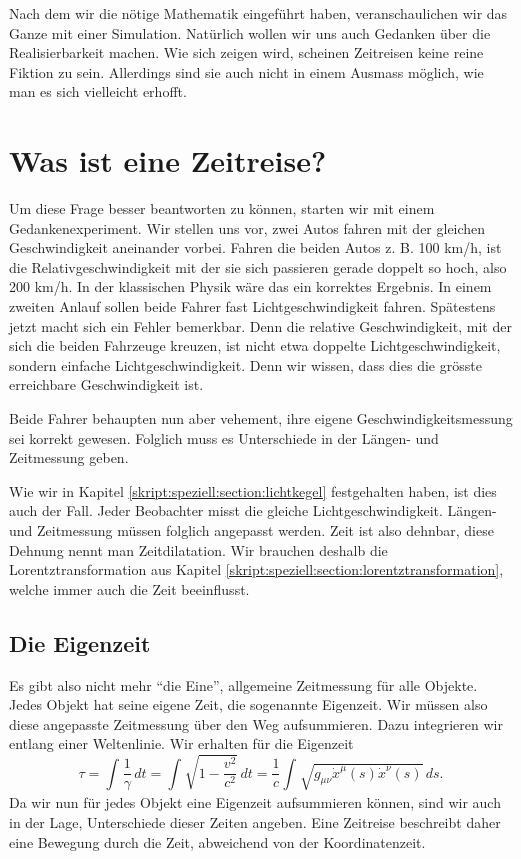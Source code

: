 \begin{refsection}
Nach dem wir die nötige Mathematik eingeführt haben, veranschaulichen wir das Ganze mit einer Simulation. Natürlich wollen wir uns auch Gedanken über die Realisierbarkeit machen. Wie sich zeigen wird, scheinen Zeitreisen keine reine Fiktion zu sein. Allerdings sind sie auch nicht in einem Ausmass möglich, wie man es sich vielleicht erhofft.

\section{Was ist eine Zeitreise?}
Um diese Frage besser beantworten zu können, starten wir mit einem Gedankenexperiment. Wir stellen uns vor, zwei Autos fahren mit der gleichen Geschwindigkeit aneinander vorbei. Fahren die beiden Autos z. B. 100 km/h, ist die Relativgeschwindigkeit mit der sie sich passieren gerade doppelt so hoch, also 200 km/h. In der klassischen Physik wäre das ein korrektes Ergebnis. In einem zweiten Anlauf sollen beide Fahrer fast Lichtgeschwindigkeit fahren. Spätestens jetzt macht sich ein Fehler bemerkbar. Denn die relative Geschwindigkeit, mit der sich die beiden Fahrzeuge kreuzen, ist nicht etwa doppelte Lichtgeschwindigkeit, sondern einfache Lichtgeschwindigkeit. Denn wir wissen, dass dies die grösste erreichbare Geschwindigkeit ist.

Beide Fahrer behaupten nun aber vehement, ihre eigene Geschwindigkeitsmessung sei korrekt gewesen. Folglich muss es Unterschiede in der Längen- und Zeitmessung geben.

Wie wir in Kapitel \ref{skript:speziell:section:lichtkegel} festgehalten haben, ist dies auch der Fall. Jeder Beobachter misst die gleiche Lichtgeschwindigkeit. Längen- und Zeitmessung müssen folglich angepasst werden. Zeit ist also dehnbar, diese Dehnung nennt man Zeitdilatation. Wir brauchen deshalb die Lorentztransformation aus Kapitel \ref{skript:speziell:section:lorentztransformation}, welche immer auch die Zeit beeinflusst.

\subsection{Die Eigenzeit}
Es gibt also nicht mehr ``die Eine'', allgemeine Zeitmessung für alle Objekte. Jedes Objekt hat seine eigene Zeit, die sogenannte Eigenzeit. Wir müssen also diese angepasste Zeitmessung über den Weg aufsummieren.
Dazu integrieren wir entlang einer Weltenlinie. Wir erhalten für die Eigenzeit
\begin{equation}\label{Eigenzeit}
\tau
=
\int_{}^{}\frac{1}{\gamma}\,dt=\int_{}^{}\sqrt{1-\frac{v^2}{c^2}}\,dt
=
\frac{1}{c}\int_{}^{}\sqrt{g_{\mu\nu}\dot{x}^{\mu}(s)\dot{x}^{\nu}(s)}\,ds.
\end{equation}
Da wir nun für jedes Objekt eine Eigenzeit aufsummieren können, sind wir auch in der Lage, Unterschiede dieser Zeiten angeben.
Eine Zeitreise beschreibt daher eine Bewegung durch die Zeit, abweichend von der Koordinatenzeit.


\end{refsection}
